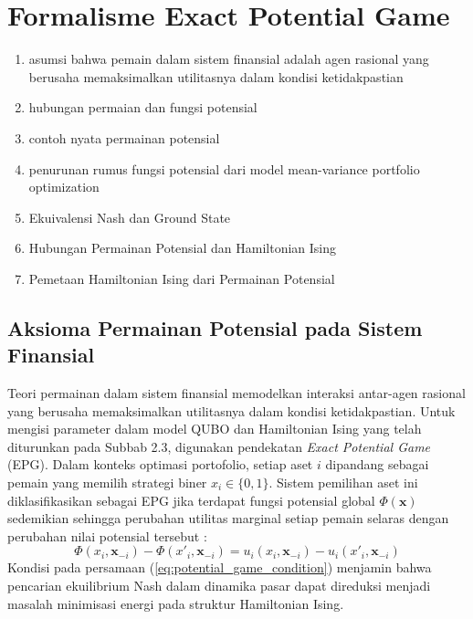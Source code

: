 \section{Formalisme Exact Potential Game}

\begin{enumerate}
    \item asumsi bahwa pemain dalam sistem finansial adalah agen rasional yang berusaha memaksimalkan utilitasnya dalam kondisi ketidakpastian
    \item hubungan permaian dan fungsi potensial
    \item contoh nyata permainan potensial
    \item penurunan rumus fungsi potensial dari model mean-variance portfolio optimization
    \item Ekuivalensi Nash dan Ground State
    \item Hubungan Permainan Potensial dan Hamiltonian Ising
    \item Pemetaan Hamiltonian Ising dari Permainan Potensial
\end{enumerate}

\subsection{Aksioma Permainan Potensial pada Sistem Finansial}

Teori permainan dalam sistem finansial memodelkan interaksi antar-agen rasional yang berusaha memaksimalkan utilitasnya dalam kondisi ketidakpastian. Untuk mengisi parameter dalam model QUBO dan Hamiltonian Ising yang telah diturunkan pada Subbab 2.3, digunakan pendekatan \textit{Exact Potential Game} (EPG). Dalam konteks optimasi portofolio, setiap aset $i$ dipandang sebagai pemain yang memilih strategi biner $x_i \in \{0, 1\}$. Sistem pemilihan aset ini diklasifikasikan sebagai EPG jika terdapat fungsi potensial global $\Phi(\mathbf{x})$ sedemikian sehingga perubahan utilitas marginal setiap pemain selaras dengan perubahan nilai potensial tersebut \cite{monderer_potential_1996}:
\begin{equation}
\Phi(x_i, \mathbf{x}_{-i}) - \Phi(x'_i, \mathbf{x}_{-i}) = u_i(x_i, \mathbf{x}_{-i}) - u_i(x'_i, \mathbf{x}_{-i})
\label{eq:potential_game_condition}
\end{equation}
Kondisi pada persamaan (\ref{eq:potential_game_condition}) menjamin bahwa pencarian ekuilibrium Nash dalam dinamika pasar dapat direduksi menjadi masalah minimisasi energi pada struktur Hamiltonian Ising.

